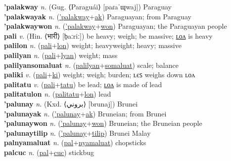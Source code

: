 \textbf{'palakway} \textit{n.} (Gug. ⟨Paraguái⟩ [paɾaˈɰwaj])
Paraguay \label{'palakway} \\
\textbf{'palakwayak} \textit{n.} (\hyperref['palakway]{'palakway}+\hyperref[ak]{ak})
Paraguayan; from Paraguay \label{'palakwayak} \\
\textbf{'palakwaywon} \textit{n.} (\hyperref['palakway]{'palakway}+\hyperref[won]{won})
Paraguayan; the Paraguayan people \label{'palakwaywon} \\
\textbf{pali} \textit{v.} (Hin. ⟨भारी⟩ [b̤aːriː])
be heavy; weigh; be massive; \hyperref[palilon]{ʟᴏᴧ} is heavy \label{pali} \\
\textbf{palilon} \textit{n.} (\hyperref[pali]{pali}+\hyperref[lon]{lon})
weight; heavyweight; heavy; massive \label{palilon} \\
\textbf{palilyan} \textit{n.} (\hyperref[pali]{pali}+\hyperref[lyan]{lyan})
weight; mass \label{palilyan} \\
\textbf{palilyansomaluat} \textit{n.} (\hyperref[palilyan]{palilyan}+\hyperref[somaluat]{somaluat})
scale; balance \label{palilyansomaluat} \\
\textbf{paliki} \textit{v.} (\hyperref[pali]{pali}+\hyperref[ki]{ki})
weight; weigh; burden; ʟєꜱ weighs down ʟᴏᴧ \label{paliki} \\
\textbf{palitatu} \textit{v.} (\hyperref[pali]{pali}+\hyperref[tatu]{tatu})
be lead; \hyperref[palitatulon]{ʟᴏᴧ} is made of lead \label{palitatu} \\
\textbf{palitatulon} \textit{n.} (\hyperref[palitatu]{palitatu}+\hyperref[lon]{lon})
lead \label{palitatulon} \\
\textbf{'palunay} \textit{n.} (Kxd. ⟨بروني⟩ [brunaj])
Brunei \label{'palunay} \\
\textbf{'palunayak} \textit{n.} (\hyperref['palunay]{'palunay}+\hyperref[ak]{ak})
Bruneian; from Brunei \label{'palunayak} \\
\textbf{'palunaywon} \textit{n.} (\hyperref['palunay]{'palunay}+\hyperref[won]{won})
Bruneian; the Bruneian people \label{'palunaywon} \\
\textbf{'palunaytilip} \textit{n.} (\hyperref['palunay]{'palunay}+\hyperref[tilip]{tilip})
Brunei Malay \label{'palunaytilip} \\
\textbf{palnyamaluat} \textit{n.} (\hyperref[pal]{pal}+\hyperref[nyamaluat]{nyamaluat})
chopsticks \label{palnyamaluat} \\
\textbf{palcuc} \textit{n.} (\hyperref[pal]{pal}+\hyperref[cuc]{cuc})
stickbug \label{palcuc} \\
